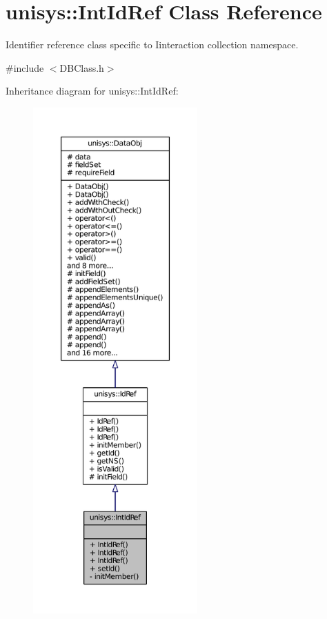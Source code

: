 \hypertarget{classunisys_1_1IntIdRef}{\section{unisys\-:\-:Int\-Id\-Ref Class Reference}
\label{classunisys_1_1IntIdRef}
}


Identifier reference class specific to Iinteraction collection namespace.  




{\ttfamily \#include $<$D\-B\-Class.\-h$>$}



Inheritance diagram for unisys\-:\-:Int\-Id\-Ref\-:
\nopagebreak
\begin{figure}[H]
\begin{center}
\leavevmode
\includegraphics[height=550pt]{classunisys_1_1IntIdRef__inherit__graph}
\end{center}
\end{figure}


